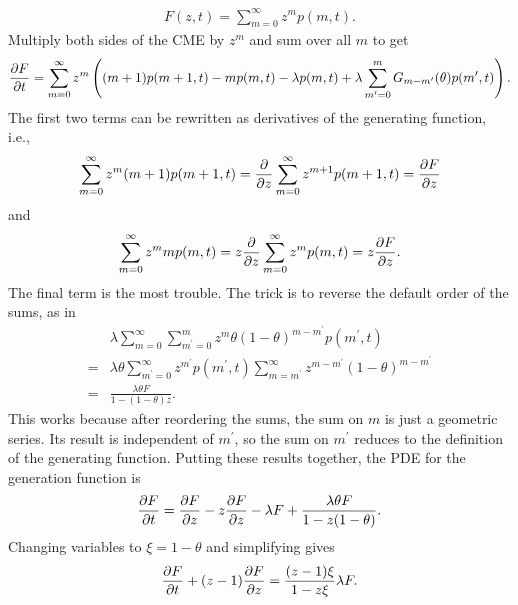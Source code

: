 \begin{align}
F(z,t) = \sum_{m=0}^\infty z^m p(m,t).
\end{align}
Multiply both sides of the CME by $z^m$ and sum over all $m$ to get
\begin{align}
\pderiv[F]{t} = \sum_{m=0}^\infty z^m
\left(
(m+1)p(m+1,t) - m p(m,t) - \lambda p(m,t)
+ \lambda \sum_{m^\prime=0}^m G_{m-m^\prime}(\theta) p(m^\prime,t)
\right).
\end{align}
The first two terms can be rewritten as derivatives of the
generating function, i.e.,
\begin{align}
\sum_{m=0}^\infty z^m (m+1)p(m+1,t)
=
\pderiv{z} \sum_{m=0}^\infty z^{m+1} p(m+1,t)
=
\pderiv[F]{z}
\end{align}
and
\begin{align}
\sum_{m=0}^\infty z^m mp(m,t)
=
z\pderiv{z} \sum_{m=0}^\infty z^m p(m,t)
=
z\pderiv[F]{z}.
\end{align}
The final term is the most trouble. The trick is to reverse
the default order of the sums, as in
\begin{align}
&\lambda \sum_{m=0}^\infty \sum_{m^\prime=0}^m
        z^m \theta(1 - \theta)^{m-m^\prime} p(m^\prime,t)
\\=
&\lambda\theta \sum_{m^\prime=0}^\infty z^{m^\prime} p(m^\prime,t)
        \sum_{m=m^\prime}^\infty
        z^{m-m^\prime} (1 - \theta)^{m-m^\prime}
\\=
&\frac{\lambda\theta F}{1 - (1 - \theta)z}.
\end{align}
This works because after reordering the sums, the sum on $m$ is just
a geometric series. Its result is independent of $m^\prime$, so the sum on
$m^\prime$ reduces to the definition of the generating function.
Putting these results together, the PDE for the generation function is
\begin{align}
\pderiv[F]{t} = \pderiv[F]{z} - z\pderiv[F]{z} - \lambda F
        + \frac{\lambda\theta F}{1-z(1-\theta)}.
\end{align}
Changing variables to $\xi=1-\theta$ and simplifying gives
\begin{align}
\pderiv[F]{t} + (z - 1) \pderiv[F]{z} = \frac{(z-1)\xi}{1-z\xi}\lambda F.
\label{eq:1state_unreg_015}
\end{align}

